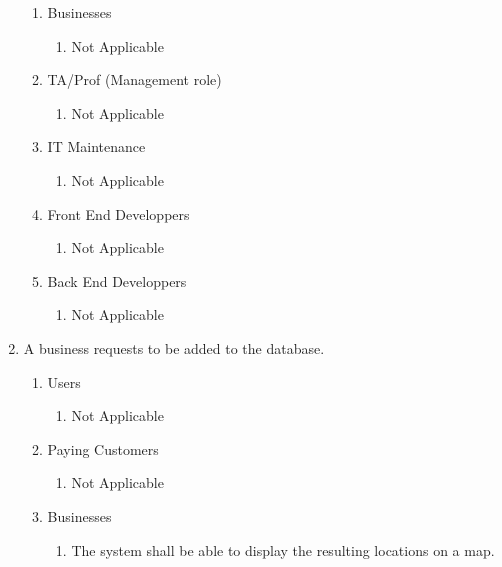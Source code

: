 \documentclass[titlepage]{article}
\begin{document}
\begin{enumerate}[\textbf{{BE}1.}]
\begin{enumerate}[\textbf{{VP1}.1}]
		\item Businesses
			\begin{enumerate}
				\item Not Applicable
			\end{enumerate}
		
		\item TA/Prof (Management role)
			\begin{enumerate}
				\item Not Applicable
			\end{enumerate}
		
		\item IT Maintenance
			\begin{enumerate}
				\item Not Applicable
			\end{enumerate}
		
		\item Front End Developpers
			\begin{enumerate}
				\item Not Applicable
			\end{enumerate}
			
		\item Back End Developpers
			\begin{enumerate}
				\item Not Applicable
			\end{enumerate}
	\end{enumerate}
	
	\item A business requests to be added to the database.
	\begin{enumerate}[\textbf{{VP2}.1}]
		
		\item Users
			\begin{enumerate}
				\item Not Applicable 
			\end{enumerate}
		
		\item Paying Customers
			\begin{enumerate}
				\item Not Applicable
			\end{enumerate}
		
		\item Businesses
			\begin{enumerate}
				\item The system shall be able to display the resulting locations on a map.
			\end{enumerate}
		

\end{enumerate}
\end{enumerate}
\end{document}

